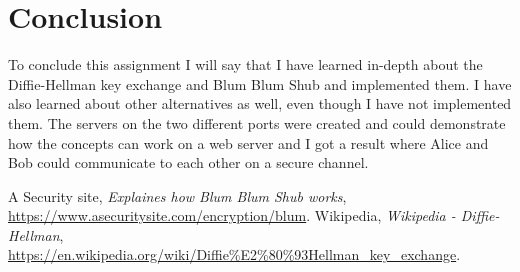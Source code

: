 \documentclass[12pt, letterpaper]{article}
\begin{document}
\section*{Conclusion}
To conclude this assignment I will say that I have learned in-depth about the Diffie-Hellman key exchange and Blum Blum Shub and implemented them. I have also learned about other alternatives as well, even though I have not implemented them. The servers on the two different ports were created and could demonstrate how the concepts can work on a web server and I got a result where Alice and Bob could communicate to each other on a secure channel.

\begin{thebibliography}{10} 
 A Security site,  \emph{Explaines how Blum Blum Shub works},
\url{https://www.asecuritysite.com/encryption/blum}.
 Wikipedia,  \emph{Wikipedia - Diffie-Hellman},
\url{https://en.wikipedia.org/wiki/Diffie%E2%80%93Hellman_key_exchange}.
\end{thebibliography}
\end{document}
